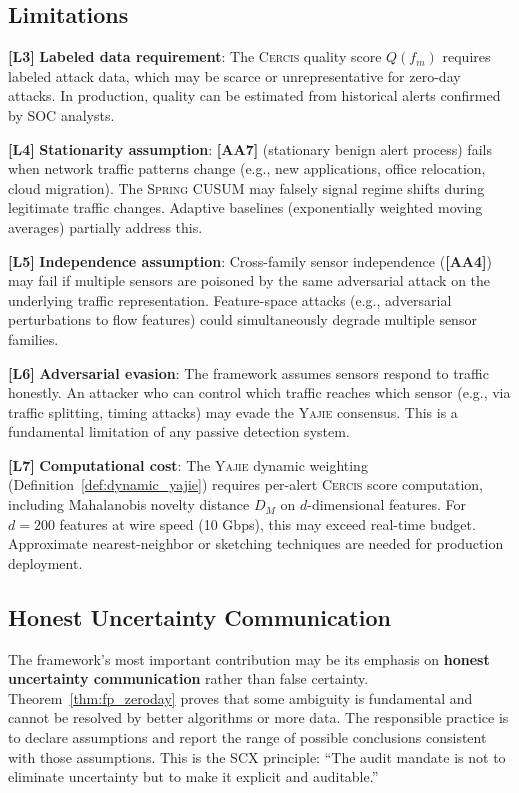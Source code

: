 \documentclass[11pt,a4paper]{article}
\theoremstyle{definition}
\theoremstyle{remark}
\newcommand{\assumptionTag}[1]{\textsf{\textbf{[A#1]}}}
\newcommand{\limitationTag}[1]{\textsf{\textbf{[L#1]}}}
\newcommand{\Yajie}{\textsc{Yajie}}
\newcommand{\Cercis}{\textsc{Cercis}}
\newcommand{\Spring}{\textsc{Spring}}
\begin{document}
\subsection{Limitations }

\limitationTag{3} \textbf{Labeled data requirement}: The \Cercis{} quality score $Q(f_m)$ requires labeled attack data, which may be scarce or unrepresentative for zero-day attacks. In production, quality can be estimated from historical alerts confirmed by SOC analysts.

\limitationTag{4} \textbf{Stationarity assumption}: \assumptionTag{A7} (stationary benign alert process) fails when network traffic patterns change (e.g., new applications, office relocation, cloud migration). The \Spring{} CUSUM may falsely signal regime shifts during legitimate traffic changes. Adaptive baselines (exponentially weighted moving averages) partially address this.

\limitationTag{5} \textbf{Independence assumption}: Cross-family sensor independence (\assumptionTag{A4}) may fail if multiple sensors are poisoned by the same adversarial attack on the underlying traffic representation. Feature-space attacks (e.g., adversarial perturbations to flow features) could simultaneously degrade multiple sensor families.

\limitationTag{6} \textbf{Adversarial evasion}: The framework assumes sensors respond to traffic honestly. An attacker who can control which traffic reaches which sensor (e.g., via traffic splitting, timing attacks) may evade the \Yajie{} consensus. This is a fundamental limitation of any passive detection system.

\limitationTag{7} \textbf{Computational cost}: The \Yajie{} dynamic weighting (Definition~\ref{def:dynamic_yajie}) requires per-alert \Cercis{} score computation, including Mahalanobis novelty distance $D_M$ on $d$-dimensional features. For $d = 200$ features at wire speed (10 Gbps), this may exceed real-time budget. Approximate nearest-neighbor or sketching techniques are needed for production deployment.

\subsection{Honest Uncertainty Communication }

The framework's most important contribution may be its emphasis on \textbf{honest uncertainty communication} rather than false certainty. Theorem~\ref{thm:fp_zeroday} proves that some ambiguity is fundamental and cannot be resolved by better algorithms or more data. The responsible practice is to declare assumptions and report the range of possible conclusions consistent with those assumptions. This is the SCX principle: ``The audit mandate is not to eliminate uncertainty but to make it explicit and auditable.''
\end{document}
